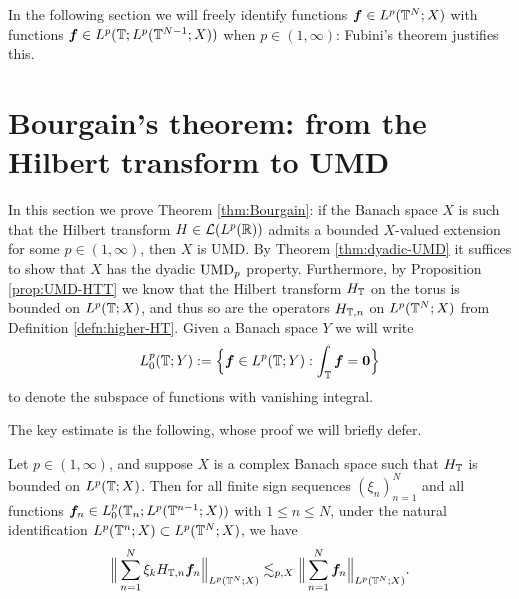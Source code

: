  In the following section we will freely identify functions $\bm{f} \in L^p(\mathbb{T}^{N};X)$ with functions $\bm{f} \in L^p(\mathbb{T} ; L^p(\mathbb{T}^{N-1};X))$ when $p \in (1,\infty)$: Fubini's theorem justifies this.


\section{Bourgain's theorem: from the Hilbert transform to UMD}

In this section we prove Theorem \ref{thm:Bourgain}: if the Banach space $X$ is such that the Hilbert transform $H \in \mathcal{L}(L^p(\mathbb{R}))$ admits a bounded $X$-valued extension for some $p \in (1,\infty)$, then $X$ is UMD.
By Theorem \ref{thm:dyadic-UMD} it suffices to show that $X$ has the dyadic $\mathrm{UMD}_{p}$ property.
Furthermore, by Proposition \ref{prop:UMD-HTT} we know that the Hilbert transform $H_{\mathbb{T}}$ on the torus is bounded on $L^p(\mathbb{T};X)$, and thus so are the operators $H_{\mathbb{T},n}$ on $L^p(\mathbb{T}^{N};X)$ from Definition \ref{defn:higher-HT}.
Given a Banach space $Y$ we will write
\begin{equation*}
  L^p_{0}(\mathbb{T};Y) := \Big\{\bm{f} \in L^p(\mathbb{T};Y) : \int_{\mathbb{T}} \bm{f} = \bm{0} \Big\}
\end{equation*}
to denote the subspace of functions with vanishing integral.

The key estimate is the following, whose proof we will briefly defer.
\begin{prop}\label{prop:Bourgain-H}
  Let $p \in (1,\infty)$, and suppose $X$ is a complex Banach space such that $H_{\mathbb{T}}$ is bounded on $L^p(\mathbb{T};X)$.
  Then for all finite sign sequences $(\xi_{n})_{n=1}^{N}$ and all functions $\bm{f}_{n} \in L^p_{0}(\mathbb{T}_{n};L^p(\mathbb{T}^{n-1};X))$ with $1 \leq n \leq N$, under the natural identification $L^p(\mathbb{T}^{n};X) \subset L^p(\mathbb{T}^{N};X)$, we have
  \begin{equation*}
    \Big\| \sum_{n=1}^{N} \xi_{k} H_{\mathbb{T},n} \bm{f}_{n} \Big\|_{L^p(\mathbb{T}^{N};X)} \lesssim_{p,X} \Big\| \sum_{n=1}^{N} \bm{f}_{n} \Big\|_{L^p(\mathbb{T}^{N};X)}.
  \end{equation*}
\end{prop}

